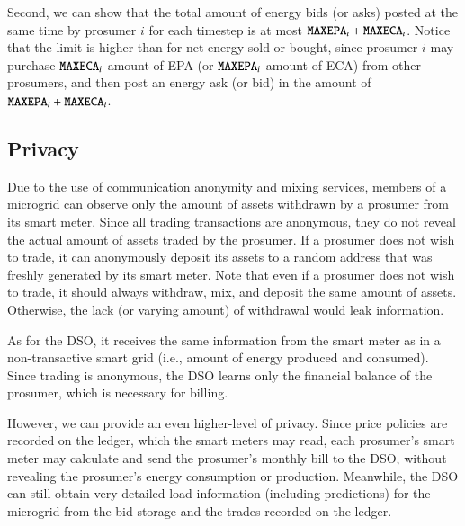 Second, we can show that the total amount of energy bids (or asks) posted at the same time by prosumer $i$ for each timestep is at most $\texttt{MAXEPA}_i + \texttt{MAXECA}_i$.
Notice that the limit is higher than for net energy sold or bought, since prosumer $i$ may purchase $\texttt{MAXECA}_i$ amount of EPA (or $\texttt{MAXEPA}_i$ amount of ECA) from other prosumers, and then post an energy ask (or bid) in the amount of $\texttt{MAXEPA}_i + \texttt{MAXECA}_i$.

\subsection{Privacy}
Due to the use of communication anonymity and mixing services, members of a microgrid can observe only the amount of assets withdrawn by a prosumer from its smart meter. %
Since all trading transactions are anonymous, they do not reveal the actual amount of assets traded by the prosumer.
If a prosumer does not wish to trade, it can anonymously deposit its assets to a random address that was freshly generated by its smart meter.
Note that even if a prosumer does not wish to trade, it should always withdraw, mix, and deposit the same amount of assets.
Otherwise, the lack (or varying amount) of withdrawal would leak information.

As for the DSO, it receives the same information from the smart meter as in a non-transactive smart grid (i.e., amount of energy produced and consumed).
Since trading is anonymous, the DSO learns only the financial balance of the prosumer, which is necessary for billing.

However, we can provide an even higher-level of privacy.
Since price policies are recorded on the ledger, which the smart meters may read, each prosumer's smart meter may calculate and send the prosumer's monthly bill to the DSO, without revealing the prosumer's energy consumption or production.
Meanwhile, the DSO can still obtain very detailed load information (including predictions) for the microgrid from the bid storage and the trades recorded on the ledger.

